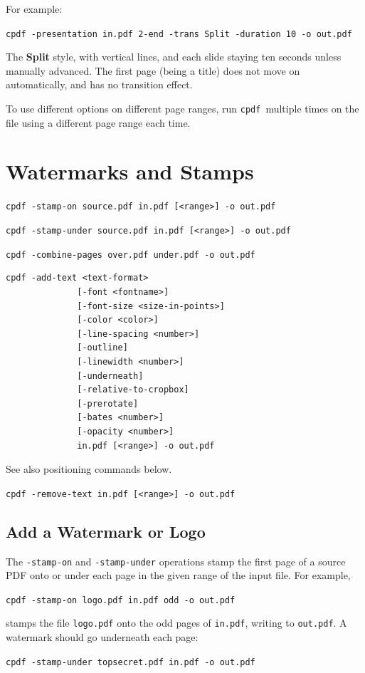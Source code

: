 \documentclass[a4paper,makeidx]{memoir}
\newcommand{\cpdf}{\texttt{cpdf}}
\begin{document}
\noindent For example:
\begin{framed}
  \small
  \noindent\verb!cpdf -presentation in.pdf 2-end -trans Split -duration 10 -o out.pdf!

  \vspace{2.5mm}
  The \textbf{Split} style, with vertical lines, and each slide staying ten
seconds unless manually advanced. The first page (being a title) does not move
on automatically, and has no transition effect.

\end{framed}

\noindent To use different options on different page ranges, run \cpdf\ multiple times on
the file using a different page range each time.

\chapter{Watermarks and Stamps}
\label{stamps}
  \begin{framed}
  \noindent\small\verb!cpdf -stamp-on source.pdf in.pdf [<range>] -o out.pdf!

  \vspace{1.5mm}
  \noindent\small\verb!cpdf -stamp-under source.pdf in.pdf [<range>] -o out.pdf!

  \vspace{1.5mm}
  \noindent\small\verb!cpdf -combine-pages over.pdf under.pdf -o out.pdf!

  \vspace{1.5mm}
  \noindent\small\begin{verbatim}cpdf -add-text <text-format>
              [-font <fontname>]
              [-font-size <size-in-points>]
              [-color <color>]
              [-line-spacing <number>]
              [-outline]
              [-linewidth <number>]
              [-underneath]
              [-relative-to-cropbox]
              [-prerotate]
              [-bates <number>]
              [-opacity <number>]
              in.pdf [<range>] -o out.pdf\end{verbatim}
  \noindent See also positioning commands below.

  \vspace{1.5mm}
  \noindent\small\verb!cpdf -remove-text in.pdf [<range>] -o out.pdf!
  \end{framed}
  \section{Add a Watermark or Logo}
  The \texttt{-stamp-on} and \texttt{-stamp-under} operations stamp the first
page of a source PDF onto or under each page in the given range of the input
file. For example,
  \begin{framed}
    \small\verb!cpdf -stamp-on logo.pdf in.pdf odd -o out.pdf!
  \end{framed}
\noindent stamps the file \texttt{logo.pdf} onto the odd pages of \texttt{in.pdf},
writing to \texttt{out.pdf}. A watermark should go underneath each page:
  \begin{framed}
    \small\verb!cpdf -stamp-under topsecret.pdf in.pdf -o out.pdf!
  \end{framed}
\end{document}
